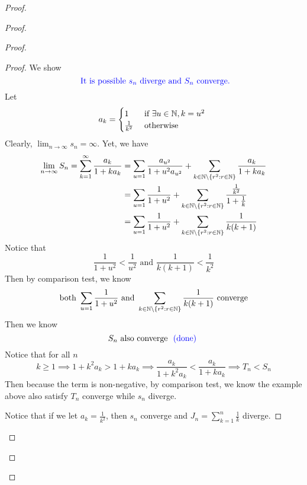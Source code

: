 \documentclass{report}
\begin{document}
\begin{proof}
\begin{proof}
\begin{proof}
\begin{proof}
We show
\begin{equation}
\textcolor{blue}{\text{ It is possible $s_n$ diverge and $S_n$ converge.}}
\end{equation}
Let 
\begin{equation}
a_k=\begin{cases}
  1& \text{ if $\exists u\in\mathbb{N}, k=u^2$ }\\
  \frac{1}{k^2}& \text{ otherwise }
\end{cases}
\end{equation}
Clearly,  $\lim_{n\to\infty}s_n=\infty$. Yet, we have
\begin{align}
  \lim_{n\to\infty}S_n=\sum_{k=1}^\infty \frac{a_k}{1+ka_k}&=\sum_{u=1}\frac{a_{u^2}}{1+u^2a_{u^2}}+\sum_{k\in\mathbb{N}\setminus \{ r^2:r\in\mathbb{N} \}}\frac{a_k}{1+ka_k}\\
&=\sum_{u=1}\frac{1}{1+u^2}+\sum_{k\in\mathbb{N}\setminus \{ r^2:r\in\mathbb{N} \}}\frac{\frac{1}{k^2}}{1+\frac{1}{k}}\\
&=\sum_{u=1}\frac{1}{1+u^2}+\sum_{k\in\mathbb{N}\setminus \{ r^2:r\in\mathbb{N} \}} \frac{1}{k(k+1)}
\end{align}
Notice that 
\begin{equation}
\frac{1}{1+u^2}<\frac{1}{u^2}\text{ and }\frac{1}{k(k+1)}<\frac{1}{k^2}
\end{equation}
Then by comparison test, we know 
\begin{equation}
\text{ both }\sum_{u=1}\frac{1}{1+u^2}\text{ and }\sum_{k\in\mathbb{N}\setminus \{ r^2:r\in\mathbb{N} \}} \frac{1}{k(k+1)}\text{ converge }
\end{equation}
Then we know
\begin{equation}
S_n\text{ also converge }\textcolor{blue}{\text{ (done) }}
\end{equation}
Notice that for all $n$
\begin{equation}
k\geq 1\implies 1+k^2a_k>1+ka_k\implies \frac{a_k}{1+k^2a_k}<\frac{a_k}{1+ka_k}\implies T_n<S_n
\end{equation}
Then because the term is non-negative, by comparison test, we know the example above also satisfy $T_n$ converge while $s_n$ diverge.

Notice that if we let $a_k=\frac{1}{k^2}$, then $s_n$ converge and $J_n=\sum_{k=1}^n \frac{1}{k}$ diverge. 


\end{proof}
\end{proof}
\end{proof}
\end{proof}
\end{document}
